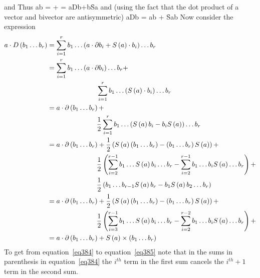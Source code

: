 and
\color{red}
\be
{}
\ee
\normalcolor
Thus
\be
 a\cdot\partial b = + = a\cdot Db+b\cdot\f{S}{a}
\ee
and (using the fact that the dot product of a vector and bivector are antisymmetric)
\be
 a\cdot Db = a\cdot\partial b + \f{S}{a}\cdot b
\ee
Now consider the expression
\begin{align}
 a\cdot {D}\left ( {b_{1}\dots b_{r}} \right ) &= \sum_{i=1}^{r}b_{1}\dots\left ( {a\cdot\partial b_{i}+{S}\left ( {a} \right )\cdot b_{i}} \right )\dots b_{r} \nonumber \\
                                &= \sum_{i=1}^{r}b_{1}\dots\left ( {a\cdot\partial b_{i}} \right )\dots b_{r}+ \nonumber \\
                                &\hspace{1in}\sum_{i=1}^{r}b_{1}\dots\left ( {{S}\left ( {a} \right )\cdot b_{i}} \right )\dots b_{r} \nonumber \\
                                &= a\cdot{\partial}\left ( {b_{1}\dots b_{r}} \right )+ \nonumber \\
                                &\hspace{1in}\displaystyle\frac{1}{2}\sum_{i=1}^{r}b_{1}\dots\left ( {{S}\left ( {a} \right ) b_{i}-b_{i}{S}\left ( {a} \right )} \right )\dots b_{r} \nonumber \\
                                &= a\cdot{\partial}\left ( {b_{1}\dots b_{r}} \right )+\displaystyle\frac{1}{2}\left ( {{S}\left ( {a} \right )\left ( {b_{1}\dots b_{r}} \right )-\left ( {b_{1}\dots b_{r}} \right ){S}\left ( {a} \right )} \right )+\nonumber \\
                                &\hspace{1in}\displaystyle\frac{1}{2}\left ( {\sum_{i=2}^{r-1}b_{1}\dots{S}\left ( {a} \right ) b_{i}\dots b_{r}-\sum_{i=2}^{r-1}b_{1}\dots b_{i}{S}\left ( {a} \right )\dots b_{r}} \right ) +\nonumber \\
                                &\hspace{1in}\displaystyle\frac{1}{2}\left ( {b_{1}\dots b_{r-1}{S}\left ( {a} \right ) b_{r}-b_{1}{S}\left ( {a} \right ) b_{2}\dots b_{r}} \right )\nonumber \\
                                &= a\cdot{\partial}\left ( {b_{1}\dots b_{r}} \right )+\displaystyle\frac{1}{2}\left ( {{S}\left ( {a} \right )\left ( {b_{1}\dots b_{r}} \right )-\left ( {b_{1}\dots b_{r}} \right ){S}\left ( {a} \right )} \right )+\nonumber \\
                                &\hspace{1in}\displaystyle\frac{1}{2}\left ( {\sum_{i=3}^{r-1}b_{1}\dots{S}\left ( {a} \right ) b_{i}\dots b_{r}-\sum_{i=2}^{r-2}b_{1}\dots b_{i}{S}\left ( {a} \right )\dots b_{r}} \right ) +\label{eq384} \\                               
                                &= a\cdot{\partial}\left ( {b_{1}\dots b_{r}} \right )+{S}\left ( {a} \right )\times\left ( {b_{1}\dots b_{r}} \right ) \label{eq385}
\end{align}
To get from equation~\ref{eq384} to equation~\ref{eq385} note that in the sums in parenthesis in equation~\ref{eq384} the $i^{th}$ term in the first sum cancels the
$i^{th}+1$ term in the second sum.

